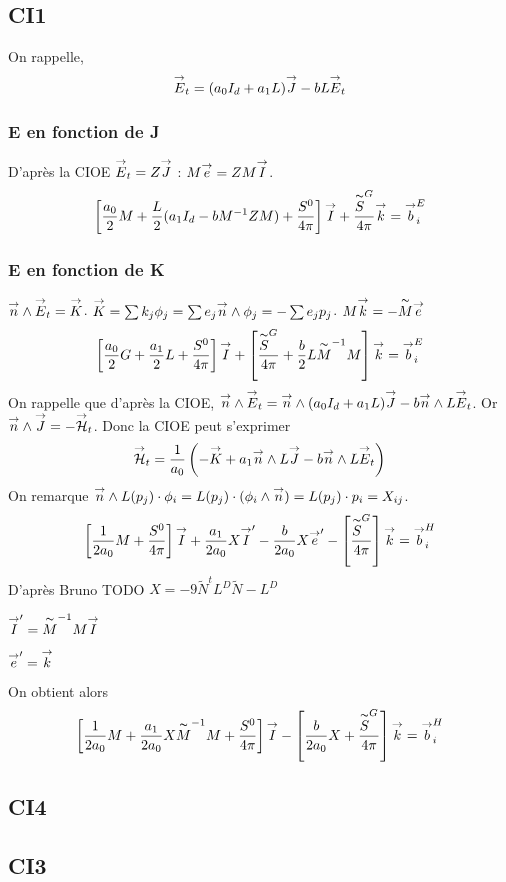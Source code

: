     \subsection{CI1}
      On rappelle,
      \begin{equation}
        \vE_t = (a_0I_d+a_1L)\vJ -bL\vE_t
      \end{equation}
      \subsubsection{E en fonction de J}
    D’après la CIOE \(\vE_t = Z\vJ\) : \(M\vect e = Z M\vect I\).
    \[
    \left[\frac{a_0}{2}M + \frac{L}{2}(a_1I_d - bM^{-1}ZM) + \frac{S^0}{4\pi}\right]\vect I + \frac{\tilde S^G }{4\pi}\vect k = \vect b_i^E
    \]
    \subsubsection{E en fonction de K}
    \(\vn \pvect \vE_t = \vK\).
    \(\vK = \sum k_j \phi_j = \sum e_j \vn \pvect \phi_j = -\sum e_j p_j \).
    \(M \vect k = - \tilde M \vect e\)
    \[
    \left[\frac{a_0}{2}G + \frac{a_1}{2}L+\frac{S^0}{4\pi}\right]\vect I + \left[\frac{\tilde S^G }{4\pi}+  \frac{b}{2}L\tilde M^{-1}M \right]\vect k = \vect b_i^E
    \]
    On rappelle que d’après la CIOE, \(\vn \pvect \vE_t = \vn \pvect (a_0I_d+a_1L)\vJ -b\vn\pvect L\vE_t\). Or \(\vn\pvect \vJ = -\vH_t\). Donc la CIOE peut s'exprimer
    \[
    \vH_t = \frac{1}{a_0}\left(-\vK + a_1 \vn\pvect L\vJ -b\vn\pvect L\vE_t\right)
    \]
        On remarque \( \vn \pvect L(p_j)\cdot \phi_i = L(p_j)\cdot(\phi_i\pvect\vn) = L(p_j)\cdot p_i = X_{ij}\). 
    \[
    \left[\frac{1}{2a_0}M + \frac{S^0}{4\pi}\right]\vect I + \frac{a_1}{2a_0}X\vect I' - \frac{b}{2a_0}X\vect e' - \left[ \frac{\tilde S^G}{4\pi}\right]\vect k = \vect b_i^H
    \]
    D’après Bruno TODO \(X = -9\tilde N^tL^D\tilde N - L^D\) %

    \(\vect I' = \tilde M^{-1}M\vect I\)

    \(\vect e' = \vect k\)

    On obtient alors 
    \[
    \left[\frac{1}{2a_0}M + \frac{a_1}{2a_0}X\tilde M^{-1}M + \frac{S^0}{4\pi}\right]\vect I - \left[\frac{b}{2a_0}X+ \frac{\tilde S^G}{4\pi}\right]\vect k = \vect b_i^H
    \]

    \subsection{CI4}
    \subsection{CI3}